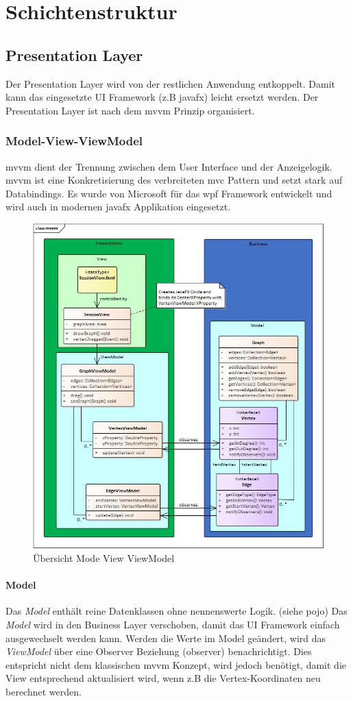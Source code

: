 \documentclass[11pt,a4paper,english,oneside]{book}
\numberwithin{equation}{chapter}
\begin{document}
	\section{Schichtenstruktur} \label{ssec:layer-architecture}
	
	\subsection{Presentation Layer}
	Der Presentation Layer wird von der restlichen Anwendung entkoppelt. Damit kann das eingesetzte UI Framework (z.B \gls{javafx}) leicht ersetzt werden. Der Presentation Layer ist nach dem \gls{mvvm} Prinzip organisiert.
	
	\subsubsection{Model-View-ViewModel} \label{sssec:mvvm}
	\gls{mvvm} dient der Trennung zwischen dem User Interface und der Anzeigelogik. \gls{mvvm} ist eine Konkretisierung des verbreiteten \gls{mvc} Pattern und setzt stark auf Databindings. Es wurde von Microsoft für das \gls{wpf} Framework entwickelt und wird auch in modernen \gls{javafx} Applikation eingesetzt.
	
	\begin{figure}[h!]
		\centering
		\includegraphics[width=0.7\linewidth]{assets/images/mvvm_concept}
		\caption[MVVM Konzept]{Übersicht Mode View ViewModel}
		\label{fig:mvvmconcept}
	\end{figure}
	
	\paragraph{Model}
	Das \textit{Model} enthält reine Datenklassen ohne nennenswerte Logik. (siehe \gls{pojo}) Das \textit{Model} wird in den Business Layer verschoben, damit das UI Framework einfach ausgewechselt werden kann. Werden die Werte im Model geändert, wird das \textit{ViewModel} über eine Observer Beziehung (\gls{observer}) benachrichtigt. Dies entspricht nicht dem klassischen \gls{mvvm} Konzept, wird jedoch benötigt, damit die View entsprechend aktualisiert wird, wenn z.B die Vertex-Koordinaten neu berechnet werden.
	
\end{document}
